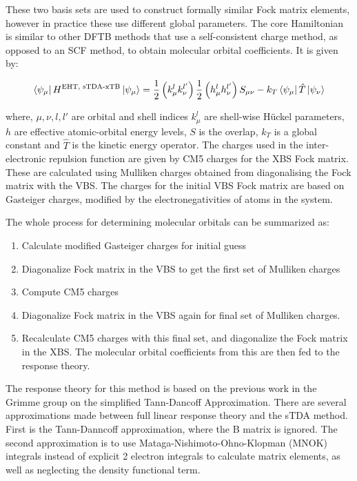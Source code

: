 These two basis sets are used to construct formally similar Fock matrix elements,
however in practice these use different global parameters. The core Hamiltonian
is similar to other DFTB methods that use a self-consistent charge method, as
opposed to an SCF method, to obtain molecular orbital coefficients. It is given by:

\begin{equation}
\bra{\psi_\mu} H^{\text{EHT, sTDA-xTB}} \ket{\psi_\mu}= \frac{1}{2} \left(k^l_\mu k^{l'}_\nu\right) \frac{1}{2} \left(h^l_\mu h^{l'}_\nu\right) S_{\mu\nu} - k_T \bra{\psi_\mu}\hat{T}\ket{\psi_\nu}
\end{equation}

where, $\mu,\nu,l,l'$ are orbital and shell indices  $k^l_\mu$ are shell-wise 
H{\"u}ckel parameters, $h$ are effective atomic-orbital energy levels, $S$ is
the overlap, $k_T$ is a global constant and $\hat{T}$ is the kinetic energy 
operator. The charges used in the inter-electronic repulsion function are given 
by CM5 charges for the XBS Fock matrix. These are calculated using Mulliken 
charges obtained from diagonalising the Fock matrix with the VBS. The charges for 
the initial VBS Fock matrix are based on Gasteiger charges, modified by the 
electronegativities of atoms in the system.

The whole process for determining molecular orbitals can be summarized as:
\begin{enumerate}
	\item Calculate modified Gasteiger charges for initial guess
	\item Diagonalize Fock matrix in the VBS to get the first set of Mulliken charges
	\item Compute CM5 charges
	\item Diagonalize Fock matrix in the VBS again for final set of Mulliken charges.
	\item Recalculate CM5 charges with this final set, and diagonalize the Fock matrix in the XBS. The molecular orbital coefficients from this are then fed to the response theory.
\end{enumerate}

The response theory for this method is based on the previous work in the Grimme 
group on the simplified Tann-Dancoff Approximation. There are several approximations 
made between full linear response theory and the sTDA method. First is the 
Tann-Danncoff approximation, where the B matrix is ignored. The second approximation 
is to use Mataga-Nishimoto-Ohno-Klopman (MNOK) integrals instead of explicit 2 electron 
integrals to calculate matrix elements, as well as neglecting the density 
functional term. 

